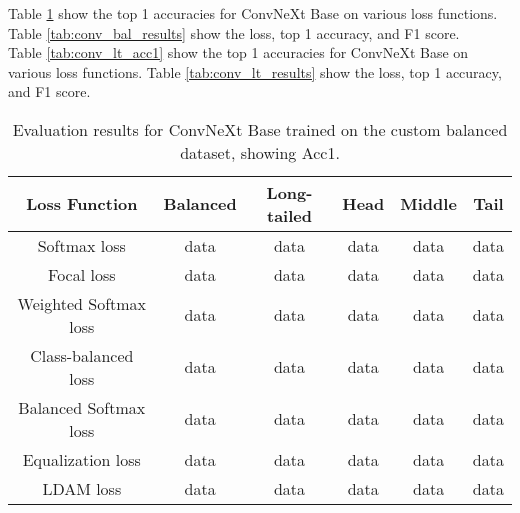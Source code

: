 Table \ref{tab:conv_bal_acc1} show the top 1 accuracies for ConvNeXt Base on various loss functions. Table \ref{tab:conv_bal_results} show the loss, top 1 accuracy, and F1 score.\\

Table \ref{tab:conv_lt_acc1} show the top 1 accuracies for ConvNeXt Base on various loss functions. Table \ref{tab:conv_lt_results} show the loss, top 1 accuracy, and F1 score.

\begin{table}[h!]
    \centering
    \begin{tabular}{cccccc}
        \toprule
        Loss Function & Balanced & Long-tailed & Head & Middle & Tail \\ 
        \midrule
        Softmax loss   & data & data & data & data & data \\
        Focal loss   & data & data & data & data & data \\
        Weighted Softmax loss   & data & data & data & data & data \\
        Class-balanced loss   & data & data & data & data & data \\
        Balanced Softmax loss   & data & data & data & data & data \\
        Equalization loss   & data & data & data & data & data \\
        LDAM loss   & data & data & data & data & data \\
        \bottomrule
    \end{tabular}
    \caption{Evaluation results for ConvNeXt Base trained on the custom balanced dataset, showing Acc1.}
    \label{tab:conv_bal_acc1}
\end{table}


